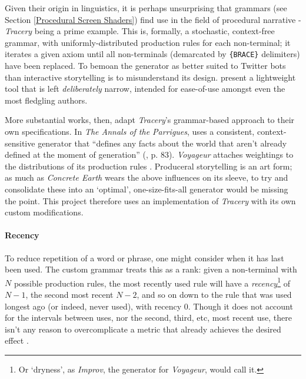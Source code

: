 \documentclass[a4paper, 11pt]{article}
\begin{document}
\begin{flushleft}
Given their origin in linguistics, it is perhaps unsurprising that grammars (see Section \ref{Procedural Screen Shaders}) find use in the field of procedural narrative - \textit{Tracery} \citep{comptonTracery} being a prime example. This is, formally, a stochastic, context-free grammar, with uniformly-distributed production rules for each non-terminal; it iterates a given axiom until all non-terminals (demarcated by \texttt{\{BRACE\}} delimiters) have been replaced. To bemoan the generator as better suited to Twitter bots than interactive storytelling is to misunderstand its design. \citeauthor{comptonTracery} present a lightweight tool that is left \textit{deliberately} narrow, intended for ease-of-use amongst even the most fledgling authors.

\vspace{5pt}\noindent
More substantial works, then, adapt \textit{Tracery}'s grammar-based approach to their own specifications. In \textit{The Annals of the Parrigues}, \citeauthor{shortParrigues} uses a consistent, context-sensitive generator that ``defines any facts about the world that aren’t already defined at the moment of generation'' (\citeyear{shortParrigues}, p. 83). \textit{Voyageur} \citep{diasVoyageur} attaches weightings to the distributions of its production rules \citep{diasVoyageurDescriptions}. Produceral storytelling is an art form; as much as \textit{Concrete Earth} wears the above influences on its sleeve, to try and consolidate these into an `optimal', one-size-fits-all generator would be missing the point. This project therefore uses an implementation of \textit{Tracery} with its own custom modifications.

\paragraph{Recency} To reduce repetition of a word or phrase, one might consider when it has last been used. The custom grammar treats this as a rank: given a non-terminal with $N$ possible production rules, the most recently used rule will have a \textit{recency}\footnote{Or `dryness', as \textit{Improv}, the generator for \textit{Voyageur}, would call it.} of $N-1$, the second most recent $N-2$, and so on down to the rule that was used longest ago (or indeed, never used), with recency $0$. Though it does not account for the intervals between uses, nor the second, third, etc, most recent use, there isn't any reason to overcomplicate a metric that already achieves the desired effect \citep{kazemiSimpleProceduralGeneration}.


\end{flushleft}
\end{document}
